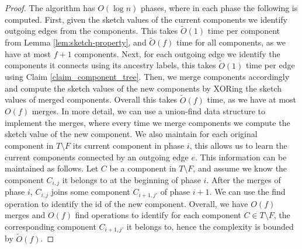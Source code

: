\begin{proof}%
The algorithm has $O(\log{n})$ phases, where in each phase the following is computed. First, given the sketch values of the current components we identify outgoing edges from the components. This takes $\widetilde{O}(1)$ time per component from Lemma \ref{lem:sketch-property}, and $\widetilde{O}(f)$ time for all components, as we have at most $f+1$ components. Next, for each outgoing edge we identify the components it connects using its ancestry labels, this takes $\widetilde{O}(1)$ time per edge using Claim \ref{claim_component_tree}. Then, we merge components accordingly and compute the sketch values of the new components by XORing the sketch values of merged components. Overall this takes $\widetilde{O}(f)$ time, as we have at most $O(f)$ merges. In more detail, we can use a union-find data structure to implement the merges, where every time we merge components we compute the sketch value of the new component. We also maintain for each original component in $T \setminus F$ its current component in phase $i$, this allows us to learn the current components connected by an outgoing edge $e$. This information can be maintained as follows. Let $C$ be a component in $T \setminus F$, and assume we know the component $C_{i,j}$ it belongs to at the beginning of phase $i$. After the merges of phase $i$, $C_{i,j}$ joins some component $C_{i+1,j'}$ of phase $i+1$. We can use the find operation to identify the id of the new component. Overall, we have $O(f)$ merges and $O(f)$ find operations to identify for each component $C \in T \setminus F$, the corresponding component $C_{i+1,j'}$ it belongs to, hence the complexity is bounded by $\widetilde{O}(f)$. 
\end{proof}

